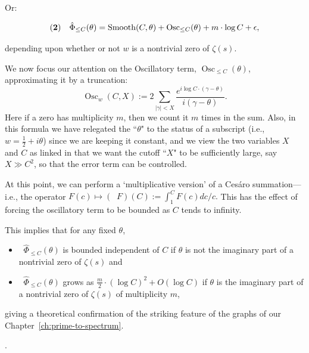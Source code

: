 \documentclass[openany]{book}
\DeclareMathOperator{\Osc}{Osc}
\DeclareMathOperator{\Smooth}{Smooth}
\DeclareMathOperator{\Ces}{C\acute{e}s}
\newcommand{\ill}[3]{%
   \begin{figure}[H]%
   \vspace{-2ex}
   \centering%
   \texttt{[image: illustrations/\#1]}%
   \caption{#3}%
   \vspace{-2ex}
    \end{figure}}
\theoremstyle{plain}
\theoremstyle{definition}
\begin{document}
{{           Or:

           $${\bf(2)}\ \ \ {\hat \Phi}_{\le C}(\theta) = {\Smooth}(C,\theta)+  {\Osc}_{\le C}(\theta) +  m\cdot \log C +\epsilon,$$

           depending upon whether or not $w$ is a nontrivial zero of $\zeta(s)$.


 We now focus our attention on the Oscillatory term,  ${\Osc}_{\le C}(\theta) $, approximating it by a truncation:  $$\Osc_w(C,X):=  2\sum_{|\gamma| <
 X} {{\frac{e^{i\log C\cdot (\gamma-\theta)}}{i(\gamma-\theta)}}}.$$
Here if a zero has multiplicity $m$, then we count it $m$ times in the sum.
Also, in this formula we have relegated the ``$\theta$" to the status of  a subscript
(i.e., $w = {\frac{1}{2}} +i\theta$) since we are keeping it constant, and we view the
two variables $X$ and $C$ as linked in that we want the cutoff ``$X$" to be sufficiently
large, say $X \gg C^2$, so that the error term can be controlled.

 At this point, we can perform a `multiplicative version' of  a Ces\'aro summation---i.e.,  the operator $F(c) \mapsto ({\Ces} F)(C):= \int_1^CF(c) dc/c.$
This has the effect of forcing the oscillatory term to be bounded as $C$ tends to infinity.

 This implies that for any fixed $\theta$,
\begin{itemize}
 \item ${\Ces}{\hat \Phi}_{\le C}(\theta)$  is bounded independent of $C$  if  $\theta$ is not the imaginary part of a nontrivial zero of $\zeta(s)$  and
 \item ${\Ces}{\hat \Phi}_{\le C}(\theta)$ grows as ${\frac{m}{2}}\cdot (\log C)^2 +O(\log C)$ if $\theta$ is the imaginary part of a nontrivial zero of $\zeta(s)$ of multiplicity $m$,
\end{itemize}
giving a theoretical confirmation of the striking feature of the
graphs of our Chapter~\ref{ch:prime-to-spectrum}.}.






}
\end{document}
